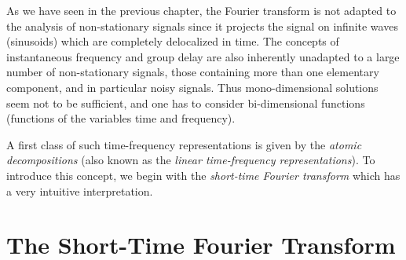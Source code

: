 
  As we have seen in the previous chapter, the Fourier transform is not
adapted to the analysis of non-stationary signals since it projects the
signal on infinite waves (sinusoids) which are completely delocalized in
time.  The concepts of instantaneous frequency and group delay are also
inherently unadapted to a large number of non-stationary signals, those
containing more than one elementary component, and in particular noisy
signals. Thus mono-dimensional solutions seem not to be sufficient, and one
has to consider bi-dimensional functions (functions of the variables time
and frequency).

  A first
class of such time-frequency representations is given by the {\it atomic
decompositions} (also known as the {\it linear time-frequency
representations}). To introduce this concept, we begin with the {\it
short-time Fourier transform} which has a very intuitive interpretation.


\section{The Short-Time Fourier Transform}
